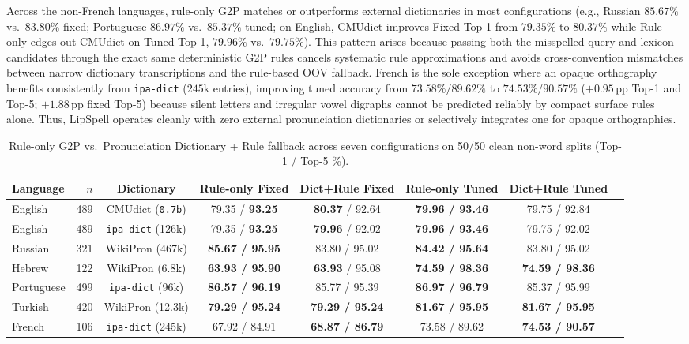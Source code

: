\documentclass[
  journal=nlp,
  manuscript=research-article,
  year=2026,
]{cup-journal}
\begin{document}
Across the non-French languages, rule-only G2P matches or outperforms external dictionaries in most configurations (e.g., Russian $85.67\%$ vs.\ $83.80\%$ fixed; Portuguese $86.97\%$ vs.\ $85.37\%$ tuned; on English, CMUdict improves Fixed Top-1 from $79.35\%$ to $80.37\%$ while Rule-only edges out CMUdict on Tuned Top-1, $79.96\%$ vs.\ $79.75\%$). This pattern arises because passing both the misspelled query and lexicon candidates through the exact same deterministic G2P rules cancels systematic rule approximations and avoids cross-convention mismatches between narrow dictionary transcriptions and the rule-based OOV fallback. French is the sole exception where an opaque orthography benefits consistently from \texttt{ipa-dict} ($245\text{k}$ entries), improving tuned accuracy from $73.58\% / 89.62\%$ to $74.53\% / 90.57\%$ ($+0.95$\,pp Top-1 and Top-5; $+1.88$\,pp fixed Top-5) because silent letters and irregular vowel digraphs cannot be predicted reliably by compact surface rules alone. Thus, LipSpell operates cleanly with zero external pronunciation dictionaries or selectively integrates one for opaque orthographies.

\begin{table}[ht]
\centering
\scriptsize
\setlength{\tabcolsep}{2.8pt}
\caption{Rule-only G2P vs.\ Pronunciation Dictionary + Rule fallback across seven configurations on 50/50 clean non-word splits (Top-1 / Top-5 \%).}
\label{tab:g2p_ablation}
\begin{tabular}{lrcccccc}
\toprule
Language & $n$ & Dictionary & Rule-only Fixed & Dict+Rule Fixed & Rule-only Tuned & Dict+Rule Tuned \\
\midrule
English    & 489 & CMUdict (\texttt{0.7b})  & 79.35 / \textbf{93.25} & \textbf{80.37} / 92.64 & \textbf{79.96 / 93.46} & 79.75 / 92.84 \\
English    & 489 & \texttt{ipa-dict} (126k) & 79.35 / \textbf{93.25} & \textbf{79.96} / 92.02 & \textbf{79.96 / 93.46} & 79.75 / 92.02 \\
Russian    & 321 & WikiPron (467k)   & \textbf{85.67 / 95.95} & 83.80 / 95.02 & \textbf{84.42 / 95.64} & 83.80 / 95.02 \\
Hebrew     & 122 & WikiPron (6.8k)   & \textbf{63.93 / 95.90} & \textbf{63.93} / 95.08 & \textbf{74.59 / 98.36} & \textbf{74.59 / 98.36} \\
Portuguese & 499 & \texttt{ipa-dict} (96k)  & \textbf{86.57 / 96.19} & 85.77 / 95.39 & \textbf{86.97 / 96.79} & 85.37 / 95.99 \\
Turkish    & 420 & WikiPron (12.3k)  & \textbf{79.29 / 95.24} & \textbf{79.29 / 95.24} & \textbf{81.67 / 95.95} & \textbf{81.67 / 95.95} \\
French     & 106 & \texttt{ipa-dict} (245k) & 67.92 / 84.91 & \textbf{68.87 / 86.79} & 73.58 / 89.62 & \textbf{74.53 / 90.57} \\
\bottomrule
\end{tabular}
\end{table}
\end{document}
